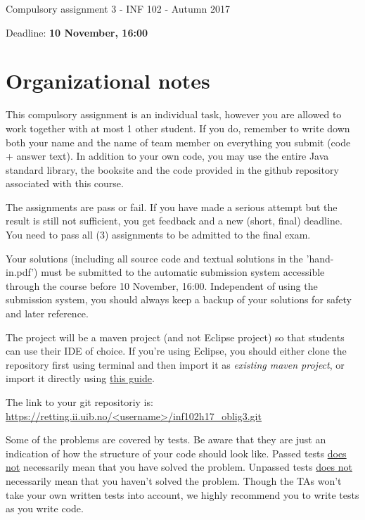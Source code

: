 \documentclass[11pt]{article}
\begin{document}
\begin{center} \huge Compulsory assignment 3 - INF 102 - Autumn 2017 \end{center}
  \hfill
  \begin{center} \large Deadline: \textbf{10 November, 16:00} \end{center}
    \hfill

    \section*{Organizational notes}
    This compulsory assignment is an individual task, however you are allowed to work together with at most 1 other student. If you do, remember to write down both your name and the name of team member on everything you submit (code + answer text).
    In addition to your own code, you may use the entire Java standard library, the booksite and the code provided in the github repository associated with this course.

    The assignments are pass or fail. If you have made a serious attempt but the result is still not sufficient, you get feedback and a new (short, final) deadline. You need to pass all (3) assignments to be admitted to the final exam.

    Your solutions (including all source code and textual solutions in the 'hand-in.pdf') must be submitted to the automatic submission system accessible through the course before 10 November, 16:00. Independent of using the submission system, you should always keep a backup of your solutions for safety and later reference.

    The project will be a maven project (and not Eclipse project) so that students can use their IDE of choice. If you're using Eclipse, you should either clone the repository first using terminal and then import it as \textit{existing maven project}, or import it directly using \href{https://stackoverflow.com/a/7269917/4080590}{\underline{this guide}}.

    The link to your git repositoriy is:
    \underline{https://retting.ii.uib.no/\textless username\textgreater/inf102h17\_oblig3.git}

    Some of the problems are covered by tests. Be aware that they are just an indication of how the structure of your code should look like. Passed tests \underline{does not} necessarily mean that you have solved the problem. Unpassed tests \underline{does not} necessarily mean that you haven't solved the problem. Though the TAs won't take your own written tests into account, we highly recommend you to write tests as you write code.
\end{document}
